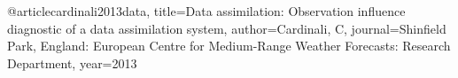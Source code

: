 @article{cardinali2013data,
  title={Data assimilation: Observation influence diagnostic of a data assimilation system},
  author={Cardinali, C},
  journal={Shinfield Park, England: European Centre for Medium-Range Weather Forecasts: Research Department},
  year={2013}
}
